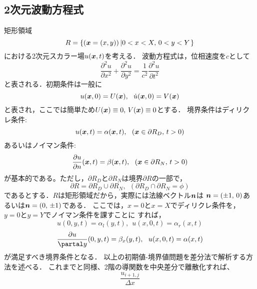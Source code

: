 \documentclass[10pt,a4j,dvipdfmx]{jarticle}
\begin{document}
\subsection{2次元波動方程式}
矩形領域
\begin{equation}
	R=\left\{
		(\mbox{\boldmath $x$}=(x,y))
		\left|
		0< x <X, \,  0 < y < Y
		\right.
	\right\}
	\label{eqn:}
\end{equation}
における2次元スカラー場$u(\mbox{\boldmath $x$},t)$を考える．
波動方程式は，位相速度を$c$として
\begin{equation}
	\frac{\partial^2 u}{\partial x^2}
	+
	\frac{\partial^2 u}{\partial y^2}
	=
	\frac{1}{c^2}
	\frac{\partial^2 u}{\partial t^2}
	\label{eqn:wveq2D}
\end{equation}
と表される．初期条件は一般に
\begin{equation}
	u(\fat{x},0)=U(\fat{x}), \ \ 
	\dot{u}(\fat{x},0)=V(\fat{x})
	\label{eqn:IC_2D}
\end{equation}
と表され，ここでは簡単ため$U(\mbox{\boldmath $x$})\equiv 0, \, V(\mbox{\boldmath $x$})\equiv 0$とする．
境界条件はディリクレ条件:
\begin{equation}
	u(\fat{x},t) = \alpha (\fat{x},t), \ \ (\fat{x}\in \partial R_D,\, t>0)
	\label{eqn:}
\end{equation}
あるいはノイマン条件:
\begin{equation}
	\frac{\partial u}{\partial n}(\mbox{\boldmath $x$},t) = \beta (\mbox{\boldmath $x$},t), \ \ (\mbox{\boldmath $x$}\in \partial R_N,\, t>0)
	\label{eqn:}
\end{equation}
が基本的である。ただし，$\partial R_D$と$\partial R_N$は境界$\partial R$の一部で，
\begin{equation}
	\partial R
	=
	\partial R_D \cup \partial R_N 
	, \ \ 
	\left(
		\partial R_D \cap \partial R_N =\phi
	\right)
	\label{eqn:}
\end{equation}
であるとする．$R$は矩形領域だから，実際には法線ベクトル$\mbox{\boldmath $n$}$は
$\mbox{\boldmath $n$}=(\pm 1,\, 0 )$あるいは$\mbox{\boldmath $n$}=(0,\, \pm 1)$である．
ここでは，$x=0$と$x=X$でディリクレ条件を，$y=0$と$y=Y$でノイマン条件を課すことに
すれば，
\begin{equation}
	u(0,y,t)=\alpha_l(y,t), \ \ u(x,0,t)=\alpha_r(x,t)
	\label{eqn:}
\end{equation}
\begin{equation}
	\frac{\partial u}{\partal y}(0,y,t)=\beta_x(y,t), \ \ u(x,0,t)=\alpha(x,t)
	\label{eqn:}
\end{equation}
が満足すべき境界条件となる．
以上の初期値-境界値問題を差分法で解析する方法を述べる．
これまでと同様、2階の導関数を中央差分で離散化すれば、
\begin{equation}
	\frac{u_{i+1,j}}{\Delta x}
	\label{eqn:}
\end{equation}
\end{document}
